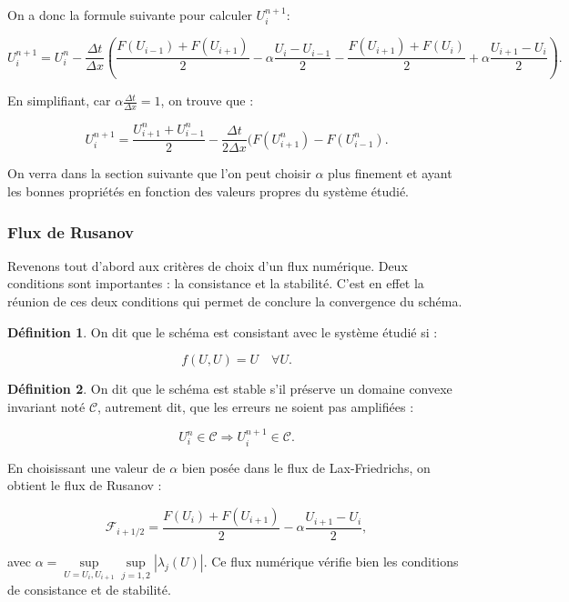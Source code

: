 \documentclass[
11pt, %
francais, %
singlespacing, %
headsepline, %
f%
]{MastersDoctoralThesis} %
\theoremstyle{definition}
\newtheorem{definition}{Définition}
\begin{document}
On a donc la formule suivante pour calculer $U_i ^{n+1}$:

$$ U_i ^{n+1} = U_i ^{n}  - \frac{\Delta t}{\Delta x} ( \frac{F(U_{i-1}) + F(U_{i+1})}{2} - \alpha \frac{U_i - U_{i-1}}{2} - \frac{F(U_{i+1}) + F(U_i)}{2} + \alpha \frac{U_{i+1} - U_i}{2} ).$$

En simplifiant, car $ \alpha \frac{\Delta t}{\Delta x} = 1 $, on trouve que :

$$ U_i ^{n+1} = \frac{U_{i+1} ^{n} + U_{i-1} ^{n}}{2}  - \frac{\Delta t}{2 \Delta x} ( F(U_{i+1} ^n ) - F(U_{i-1} ^n ).$$

On verra dans la section suivante que l'on peut choisir $\alpha$ plus finement et ayant les bonnes propriétés en fonction des valeurs propres du système étudié.

\subsubsection{Flux de Rusanov}

Revenons tout d'abord aux critères de choix d'un flux numérique. Deux conditions sont importantes : la consistance et la stabilité. C'est en effet la réunion de ces deux conditions qui permet de conclure la convergence du schéma.

\medskip

\begin{definition} On dit que le schéma est consistant avec le système étudié si :

$$ f(U,U) = U \quad \forall U.$$ 
\end{definition}

\begin{definition} On dit que le schéma est stable s'il préserve un domaine convexe invariant noté $\mathcal{C}$, autrement dit, que les erreurs ne soient pas amplifiées :

$$ U_i ^n \in \mathcal{C} \Rightarrow U_i ^{n+1} \in \mathcal{C}.  $$

\end{definition}

En choisissant une valeur de $\alpha$ bien posée dans le flux de Lax-Friedrichs, on obtient le flux de Rusanov :

$$ \mathcal{F}_{i+1/2} = \frac{F(U_i) + F(U_{i+1})}{2} - \alpha \frac{U_{i+1} - U_i}{2},$$

avec $ \alpha = \underset{U = U_i , U_{i+1}}{\sup} \underset{j = 1 , 2}{\sup} | \lambda_j(U) | $. Ce flux numérique vérifie bien les conditions de consistance et de stabilité.
\end{document}
